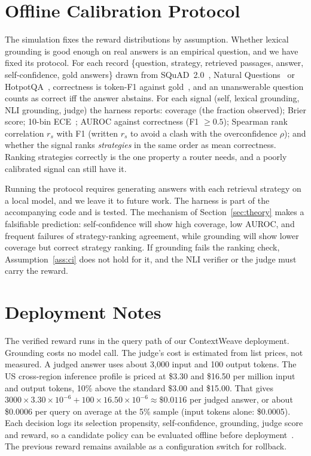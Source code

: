 \documentclass[conference]{IEEEtran}
\theoremstyle{definition}
\theoremstyle{remark}
\begin{document}
\section{Offline Calibration Protocol}\label{sec:calib}
The simulation fixes the reward distributions by assumption. Whether lexical grounding is good enough on real answers is an empirical question, and we have fixed its protocol. For each record \{question, strategy, retrieved passages, answer, self-confidence, gold answers\} drawn from SQuAD~2.0~\cite{rajpurkar2018}, Natural Questions~\cite{kwiatkowski2019} or HotpotQA~\cite{yang2018}, correctness is token-F1 against gold~\cite{rajpurkar2016}, and an unanswerable question counts as correct iff the answer abstains. For each signal (self, lexical grounding, NLI grounding, judge) the harness reports: coverage (the fraction observed); Brier score; 10-bin ECE~\cite{guo2017}; AUROC against correctness (F1 $\ge 0.5$); Spearman rank correlation $r_s$ with F1 (written $r_s$ to avoid a clash with the overconfidence $\rho$); and whether the signal ranks \emph{strategies} in the same order as mean correctness. Ranking strategies correctly is the one property a router needs, and a poorly calibrated signal can still have it.

Running the protocol requires generating answers with each retrieval strategy on a local model, and we leave it to future work. The harness is part of the accompanying code and is tested. The mechanism of Section~\ref{sec:theory} makes a falsifiable prediction: self-confidence will show high coverage, low AUROC, and frequent failures of strategy-ranking agreement, while grounding will show lower coverage but correct strategy ranking. If grounding fails the ranking check, Assumption~\ref{ass:ci} does not hold for it, and the NLI verifier or the judge must carry the reward.

\section{Deployment Notes}
The verified reward runs in the query path of our ContextWeave deployment. Grounding costs no model call. The judge's cost is estimated from list prices, not measured. A judged answer uses about 3{,}000 input and 100 output tokens. The US cross-region inference profile is priced at \$3.30 and \$16.50 per million input and output tokens, 10\% above the standard \$3.00 and \$15.00. That gives $3000\times3.30\times10^{-6}+100\times16.50\times10^{-6}\approx\$0.0116$ per judged answer, or about \$0.0006 per query on average at the 5\% sample (input tokens alone: \$0.0005). Each decision logs its selection propensity, self-confidence, grounding, judge score and reward, so a candidate policy can be evaluated offline before deployment~\cite{comp-gate}. The previous reward remains available as a configuration switch for rollback.
\end{document}
